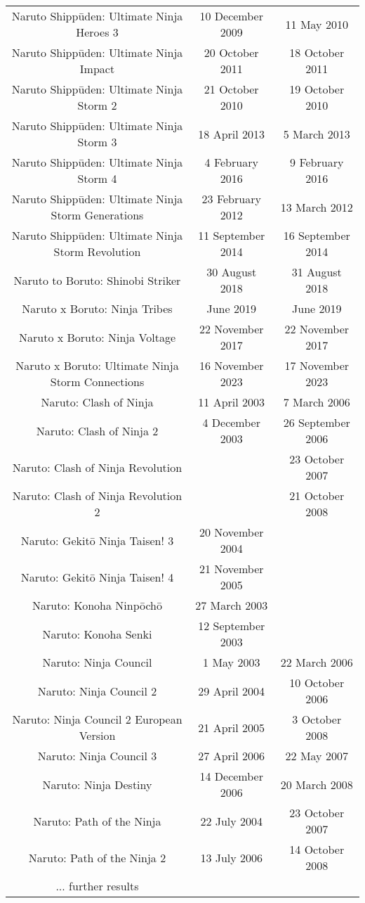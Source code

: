 \documentclass[a4paper,12pt]{article}
\begin{document}
\begin{tabular}{|c|c|c|}
Naruto Shippūden: Ultimate Ninja Heroes 3 & 10 December 2009 & 11 May 2010 \\
Naruto Shippūden: Ultimate Ninja Impact & 20 October 2011 & 18 October 2011 \\
Naruto Shippūden: Ultimate Ninja Storm 2 & 21 October 2010 & 19 October 2010 \\
Naruto Shippūden: Ultimate Ninja Storm 3 & 18 April 2013 & 5 March 2013 \\
Naruto Shippūden: Ultimate Ninja Storm 4 & 4 February 2016 & 9 February 2016 \\
Naruto Shippūden: Ultimate Ninja Storm Generations & 23 February 2012 & 13 March 2012 \\
Naruto Shippūden: Ultimate Ninja Storm Revolution & 11 September 2014 & 16 September 2014 \\
Naruto to Boruto: Shinobi Striker & 30 August 2018 & 31 August 2018 \\
Naruto x Boruto: Ninja Tribes & June 2019 & June 2019 \\
Naruto x Boruto: Ninja Voltage & 22 November 2017 & 22 November 2017 \\
Naruto x Boruto: Ultimate Ninja Storm Connections & 16 November 2023 & 17 November 2023 \\
Naruto: Clash of Ninja & 11 April 2003 & 7 March 2006 \\
Naruto: Clash of Ninja 2 & 4 December 2003 & 26 September 2006 \\
Naruto: Clash of Ninja Revolution &  & 23 October 2007 \\
Naruto: Clash of Ninja Revolution 2 &  & 21 October 2008 \\
Naruto: Gekitō Ninja Taisen! 3 & 20 November 2004 &  \\
Naruto: Gekitō Ninja Taisen! 4 & 21 November 2005 &  \\
Naruto: Konoha Ninpōchō & 27 March 2003 &  \\
Naruto: Konoha Senki & 12 September 2003 &  \\
Naruto: Ninja Council & 1 May 2003 & 22 March 2006 \\
Naruto: Ninja Council 2 & 29 April 2004 & 10 October 2006 \\
Naruto: Ninja Council 2 European Version & 21 April 2005 & 3 October 2008 \\
Naruto: Ninja Council 3 & 27 April 2006 & 22 May 2007 \\
Naruto: Ninja Destiny & 14 December 2006 & 20 March 2008 \\
Naruto: Path of the Ninja & 22 July 2004 & 23 October 2007 \\
Naruto: Path of the Ninja 2 & 13 July 2006 & 14 October 2008 \\
... further results \\
\end{tabular}\\ \par \vspace{0.5cm}
\end{document}
